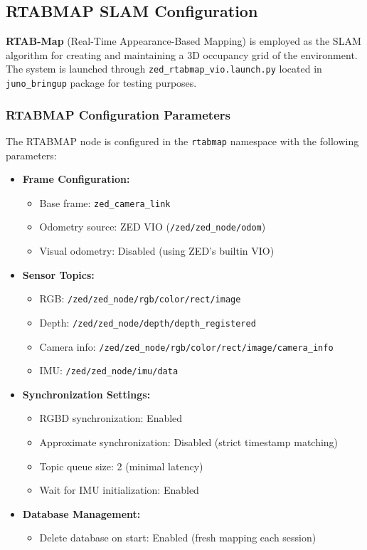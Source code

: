 \subsection{RTABMAP SLAM Configuration}
\textbf{RTAB-Map} (Real-Time Appearance-Based Mapping) is employed as the SLAM algorithm for creating and maintaining a 3D occupancy grid of the environment. The system is launched through \texttt{zed\_rtabmap\_vio.launch.py} located in 
\texttt{juno\_bringup}
package for testing purposes.

\subsubsection{RTABMAP Configuration Parameters}
The RTABMAP node is configured in the \texttt{rtabmap} namespace with the following parameters:

\begin{itemize}
    \item \textbf{Frame Configuration:}
    \begin{itemize}
        \item Base frame: \texttt{zed\_camera\_link}
        \item Odometry source: ZED VIO (\texttt{/zed/zed\_node/odom})
        \item Visual odometry: Disabled (using ZED's builtin VIO)
    \end{itemize}

    \item \textbf{Sensor Topics:}
    \begin{itemize}
        \item RGB: \texttt{/zed/zed\_node/rgb/color/rect/image}
        \item Depth: \texttt{/zed/zed\_node/depth/depth\_registered}
        \item Camera info: \texttt{/zed/zed\_node/rgb/color/rect/image/camera\_info}
        \item IMU: \texttt{/zed/zed\_node/imu/data}
    \end{itemize}

    \item \textbf{Synchronization Settings:}
    \begin{itemize}
        \item RGBD synchronization: Enabled
        \item Approximate synchronization: Disabled (strict timestamp matching)
        \item Topic queue size: 2 (minimal latency)
        \item Wait for IMU initialization: Enabled
    \end{itemize}

    \item \textbf{Database Management:}
    \begin{itemize}
        \item Delete database on start: Enabled (fresh mapping each session)
    \end{itemize}
\end{itemize}

